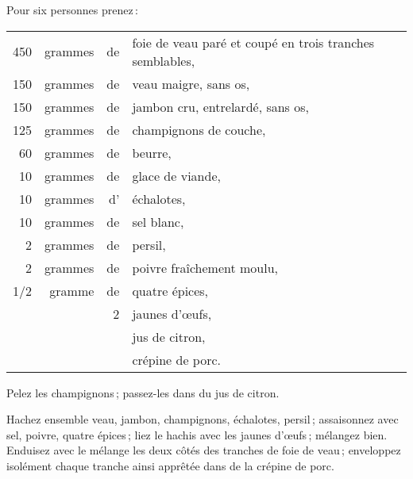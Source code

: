 Pour six personnes prenez :

\medskip

\footnotesize
\begin{longtable}{rrrp{18em}}
    450 & grammes & de & foie de veau paré et coupé en trois tranches semblables,                         \\
    150 & grammes & de & veau maigre, sans os,                                                            \\
    150 & grammes & de & jambon cru, entrelardé, sans os,                                                 \\
    125 & grammes & de & champignons de couche,                                                           \\
     60 & grammes & de & beurre,                                                                          \\
     10 & grammes & de & glace de viande,                                                                 \\
     10 & grammes & d' & échalotes,                                                                       \\
     10 & grammes & de & sel blanc,                                                                       \\
      2 & grammes & de & persil,                                                                          \\
      2 & grammes & de & poivre fraîchement moulu,                                                        \\
    1/2 &  gramme & de & quatre épices,                                                                   \\
        &         &  2 & jaunes d'œufs,                                                                   \\
        &         &    & jus de citron,                                                                   \\
        &         &    & crépine de porc.                                                                 \\
\end{longtable}
\normalsize

Pelez les champignons ; passez-les dans du jus de citron.

Hachez ensemble veau, jambon, champignons, échalotes, persil ; assaisonnez avec
sel, poivre, quatre épices ; liez le hachis avec les jaunes d'œufs ; mélangez
bien. Enduisez avec le mélange les deux côtés des tranches de foie de veau ;
enveloppez isolément chaque tranche ainsi apprêtée dans de la crépine de porc.

